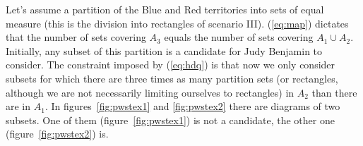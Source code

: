 \documentclass[12pt]{article}
\begin{document}

Let's assume a partition of the Blue and Red territories into sets of
equal measure (this is the division into rectangles of scenario III).
({\ref{eq:map}}) dictates that the number of sets covering $A_{3}$
equals the number of sets covering $A_{1}\cup{}A_{2}$. Initially, any
subset of this partition is a candidate for Judy Benjamin to consider.
The constraint imposed by ({\ref{eq:hdq}}) is that now we only
consider subsets for which there are three times as many partition
sets (or rectangles, although we are not necessarily limiting
ourselves to rectangles) in $A_{2}$ than there are in $A_{1}$. In
figures~\ref{fig:pwstex1} and \ref{fig:pwstex2} there are diagrams of
two subsets. One of them (figure~\ref{fig:pwstex1}) is not a
candidate, the other one (figure~\ref{fig:pwstex2}) is.
\end{document}
